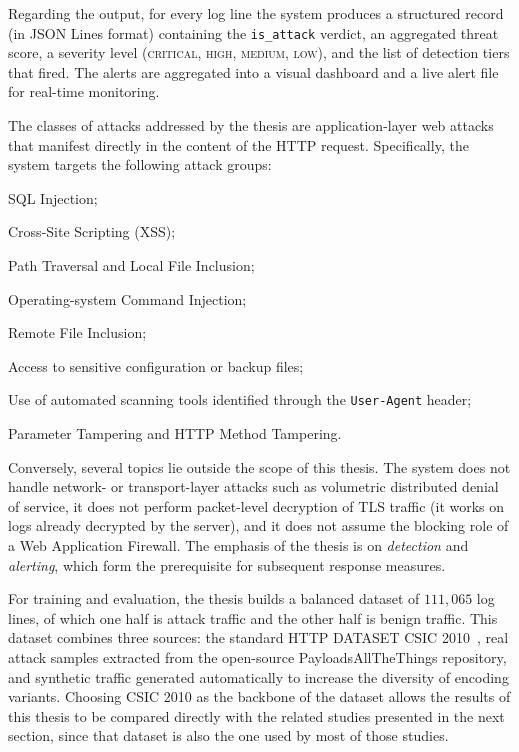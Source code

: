 \documentclass[../main.tex]{subfiles}
\begin{document}
Regarding the output, for every log line the system produces a structured
record (in JSON Lines format) containing the \texttt{is\_attack} verdict,
an aggregated threat score, a severity level (\textsc{critical},
\textsc{high}, \textsc{medium}, \textsc{low}), and the list of detection
tiers that fired. The alerts are aggregated into a visual dashboard and a
live alert file for real-time monitoring.

The classes of attacks addressed by the thesis are application-layer web
attacks that manifest directly in the content of the HTTP request.
Specifically, the system targets the following attack groups:

\begin{romanlist}
  \item SQL Injection;
  \item Cross-Site Scripting (XSS);
  \item Path Traversal and Local File Inclusion;
  \item Operating-system Command Injection;
  \item Remote File Inclusion;
  \item Access to sensitive configuration or backup files;
  \item Use of automated scanning tools identified through the
        \texttt{User-Agent} header;
  \item Parameter Tampering and HTTP Method Tampering.
\end{romanlist}

Conversely, several topics lie outside the scope of this thesis. The
system does not handle network- or transport-layer attacks such as
volumetric distributed denial of service, it does not perform packet-level
decryption of TLS traffic (it works on logs already decrypted by the
server), and it does not assume the blocking role of a Web Application
Firewall. The emphasis of the thesis is on \emph{detection} and
\emph{alerting}, which form the prerequisite for subsequent response
measures.

For training and evaluation, the thesis builds a balanced dataset of
$111{,}065$ log lines, of which one half is attack traffic and the other
half is benign traffic. This dataset combines three sources: the standard
HTTP DATASET CSIC 2010~\cite{csic2010}, real attack samples extracted from
the open-source PayloadsAllTheThings repository, and synthetic traffic
generated automatically to increase the diversity of encoding variants.
Choosing CSIC 2010 as the backbone of the dataset allows the results of
this thesis to be compared directly with the related studies presented in
the next section, since that dataset is also the one used by most of those
studies.
\end{document}
